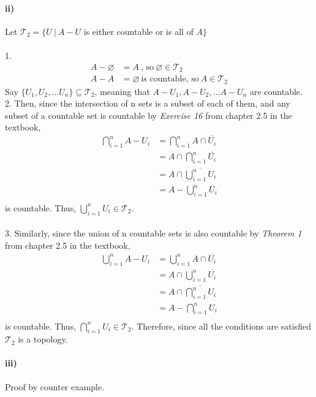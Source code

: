 \documentclass[11pt]{article}
\begin{document}
\paragraph{ii)} Let $\mathcal{T}_2 = \{U \ | \ A - U$ is either countable or is all of $A\}$ \\ \\
1.
\begin{align*}
    A - \varnothing &= A \ \text{, so} \ \varnothing \in \mathcal{T}_2 \\
    A - A &= \varnothing \ \text{is countable, so} \ A \in \mathcal{T}_2
\end{align*}
Say $\{U_1, U_2, \dots U_n\} \subseteq \mathcal{T}_2$, meaning that $A - U_1, A - U_2, \dots A - U_n$ are countable. \\
2. Then, since the intersection of n sets is a subset of each of them, and any subset of a countable set is countable by \textit{Exercise 16} from chapter 2.5 in the textbook,
\begin{align*}
    \bigcap_{i = 1}^n A - U_i &= \bigcap_{i = 1}^n A \cap \overline{U_i} \\
                              &= A \cap \bigcap_{i = 1}^n \overline{U_i} \\
                              &= A \cap \overline{\bigcup_{i = 1}^n U_i} \\
                              &= A - \bigcup_{i = 1}^n U_i \\
\end{align*}
is countable. Thus, $\bigcup_{i = 1}^n U_i \in \mathcal{T}_2$. \\ \\
3. Similarly, since the union of n countable sets is also countable by \textit{Theorem 1} from chapter 2.5 in the textbook,
\begin{align*}
    \bigcup_{i = 1}^n A - U_i &= \bigcup_{i = 1}^n A \cap \overline{U_i} \\
                              &= A \cap \bigcup_{i = 1}^n \overline{U_i} \\
                              &= A \cap \overline{\bigcap_{i = 1}^n U_i} \\
                              &= A - \bigcap_{i = 1}^n U_i \\
\end{align*}
is countable. Thus, $\bigcap_{i = 1}^n U_i \in \mathcal{T}_2$. Therefore, since all the conditions are satisfied $\mathcal{T}_2$ is a topology. 

\newpage
\paragraph{iii)} Proof by counter example. \\
\end{document}
